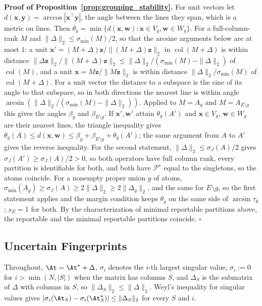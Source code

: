 \noindent\textbf{Proof of Proposition~\ref{prop:grouping_stability}.}
For unit vectors let \(d(\mathbf x,\mathbf y)=\arccos|\mathbf x^\top\mathbf y|\),
the angle between the lines they span, which is a metric on lines.  Then
\(\theta_g=\min\{d(\mathbf x,\mathbf w):\mathbf x\in V_g,\mathbf w\in W_g\}\).
For a full-column-rank \(M\) and \(\|\Delta\|_2\le\sigma_{\min}(M)/2\), so that the
arcsine arguments below are at most \(1\): a unit
\(\mathbf x'=(M+\Delta)\mathbf z/\|(M+\Delta)\mathbf z\|_2\) in
\(\operatorname{col}(M+\Delta)\) is within distance
\(\|\Delta\mathbf z\|_2/\|(M+\Delta)\mathbf z\|_2\le
\|\Delta\|_2/(\sigma_{\min}(M)-\|\Delta\|_2)\) of \(\operatorname{col}(M)\), and a unit
\(\mathbf x=M\mathbf z/\|M\mathbf z\|_2\) is within distance
\(\|\Delta\|_2/\sigma_{\min}(M)\) of \(\operatorname{col}(M+\Delta)\).  For a unit
vector the distance to a subspace is the sine of its angle to that subspace, so in
both directions the nearest line is within angle
\(\arcsin(\|\Delta\|_2/(\sigma_{\min}(M)-\|\Delta\|_2))\).  Applied to \(M=A_g\) and
\(M=A_{E\setminus g}\) this gives the angles \(\beta_g\) and \(\beta_{E\setminus g}\).  If
\(\mathbf x',\mathbf w'\) attain \(\theta_g(A')\) and \(\mathbf x\in V_g\),
\(\mathbf w\in W_g\) are their nearest lines, the triangle inequality gives
\(\theta_g(A)\le d(\mathbf x,\mathbf w)\le\beta_g+\beta_{E\setminus g}+\theta_g(A')\); the same argument
from \(A\) to \(A'\) gives the reverse inequality.  For the second statement, \(\|\Delta\|_2\le\sigma_J(A)/2\) gives
\(\sigma_J(A')\ge\sigma_J(A)/2>0\), so both operators have full column rank, every
partition is identifiable for both, and both have \(\mathcal P^\star\) equal to the
singletons, so the atoms coincide.  For a nonempty proper union \(g\) of atoms,
\(\sigma_{\min}(A_g)\ge\sigma_J(A)\ge2\|\Delta\|_2\ge2\|\Delta_g\|_2\), and the same for
\(E\setminus g\), so the first statement applies and the margin condition keeps
\(\theta_g\) on the same side of \(\arcsin\tau_\theta\); \(s_E=1\) for both.  By the
characterization of minimal reportable partitions above, the reportable and the minimal
reportable partitions coincide.  \(\square\)

\subsection{Uncertain Fingerprints}

Throughout, \(\At=\At^\star+\Delta\), \(\sigma_i\) denotes the \(i\)-th largest singular
value, \(\sigma_i:=0\) for \(i>\min(N,|S|)\) when the matrix has columns \(S\), and \(\Delta_S\) is
the submatrix of \(\Delta\) with columns in \(S\), so \(\|\Delta_S\|_2\le\|\Delta\|_2\).
Weyl's inequality for singular values gives
\(|\sigma_i(\At_S)-\sigma_i(\At^\star_S)|\le\|\Delta_S\|_2\) for every \(S\) and \(i\).

